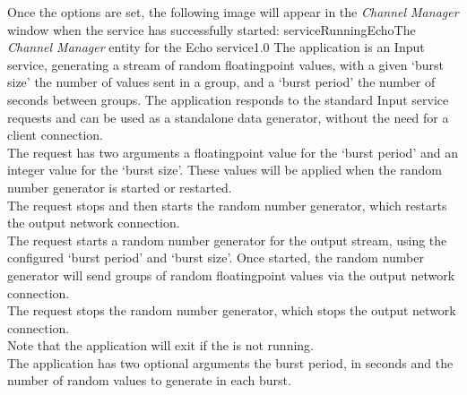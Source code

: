 Once the options are set, the following image will appear in the \emph{Channel Manager}
window when the service has successfully started:
%
{serviceRunningEcho}{The \emph{Channel Manager} entity for the Echo service}{1.0}
The  application is an Input service,
generating a stream of random floating\longDash{}point values, with a given `burst size'
\longDash{} the number of values sent in a group, and a `burst period' \longDash{} the
number of seconds between groups.
The application responds to the standard Input service requests and can be used as a
standalone data generator, without the need for a client connection.\\

The  request has two arguments
\longDash{} a floating\longDash{}point value for the `burst period' and an integer value
for the `burst size'.
These values will be applied when the random number generator is started or restarted.\\

The  request stops and then
starts the random number generator, which restarts the output \yarp{} network
connection.\\

The  request starts a random
number generator for the output stream, using the configured `burst period' and
`burst size'.
Once started, the random number generator will send groups of random
floating\longDash{}point values via the output \yarp{} network connection.\\

The  request stops the random
number generator, which stops the output \yarp{} network connection.\\ 

Note that the application will exit if the
 is not running.\\

The application has two optional arguments \longDash{} the burst period, in seconds and
the number of random values to generate in each burst.
\insertAppParameters
{}
\insertInputServiceComment\\


